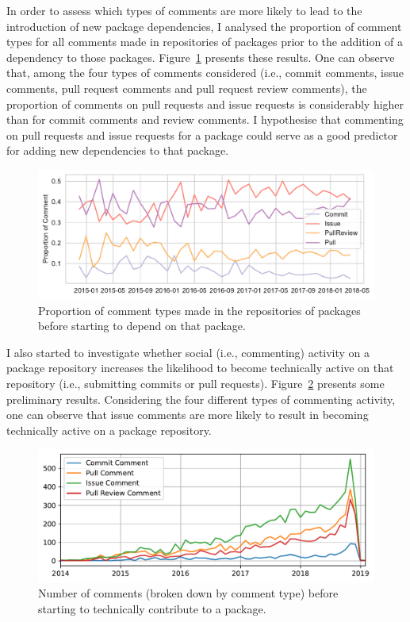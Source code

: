 In order to assess which types of comments are more likely to lead to the introduction of new package dependencies, I analysed the proportion of comment types for all comments made in repositories of packages prior to the addition of a dependency to those packages. Figure~\ref{fig:fig2} presents these results. 
One can observe that, among the four types of comments considered (i.e., commit comments, issue comments, pull request comments and pull request review comments), the proportion of comments on pull requests and issue requests is considerably higher than for commit comments and review comments. I hypothesise that commenting on pull requests and issue requests for a package could serve as a good predictor for adding new dependencies to that package.

\begin{figure}[htb]
    \includegraphics[width=0.9\columnwidth]{Photos/RQ22.pdf} 
    \caption{Proportion of comment types made in the repositories of packages before starting to depend on that package.}
    \label{fig:fig2}
\end{figure}

I also started to investigate whether social (i.e., commenting) activity on a package repository increases the likelihood to become technically active on that repository (i.e., submitting commits or pull requests). 
Figure~\ref{fig:fig3} presents some preliminary results. Considering the four different types of commenting activity, one can observe that issue comments are more likely to result in becoming technically active on a package repository.

\begin{figure}[thb]
    \includegraphics[width=0.9\columnwidth]{Photos/RQ3.pdf} 
    \caption{Number of comments (broken down by comment type) before starting  to technically contribute to a package.}
    \label{fig:fig3}
\end{figure}



